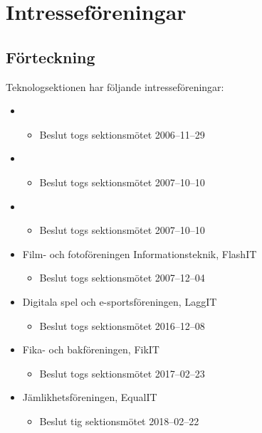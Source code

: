 \section{Intresseföreningar}

\subsection{Förteckning}

Teknologsektionen har följande intresseföreningar:

\begin{itemize}
	\item \EIGHTBITFULL{}
	\begin{itemize}
		\item Beslut togs sektionsmötet 2006--11--29
	\end{itemize}
	\item \DRAWITFULL{}
	\begin{itemize}
		\item Beslut togs sektionsmötet 2007--10--10
	\end{itemize}
	\item \HOOKITFULL{}
	\begin{itemize}
		\item Beslut togs sektionsmötet 2007--10--10
	\end{itemize}
	\item Film- och fotoföreningen Informationsteknik, FlashIT
	\begin{itemize}
		\item Beslut togs sektionsmötet 2007--12--04
	\end{itemize}
	\item Digitala spel och e-sportsföreningen, LaggIT
	\begin{itemize}
		\item Beslut togs sektionsmötet 2016--12--08
	\end{itemize}
        \item Fika- och bakföreningen, FikIT
        \begin{itemize}
                \item Beslut togs sektionsmötet 2017--02--23
        \end{itemize}
	\item  Jämlikhetsföreningen, EqualIT
	\begin{itemize}
		\item  Beslut tig sektionsmötet 2018--02--22
	\end{itemize}
\end{itemize}
